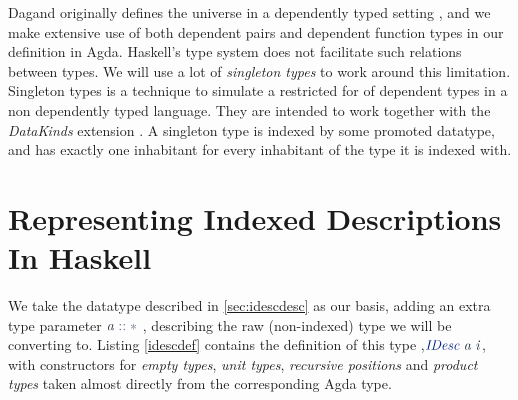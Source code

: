 \documentclass[a4paper,msc,twosized=semi]{uustthesis}
\let\oldemph\emph
\renewcommand\emph[1]{{\large\oldemph{#1}}}
\newcommand*{\mathcolor}{}
\def\mathcolor#1#{\mathcoloraux{#1}}
\newcommand*{\mathcoloraux}[3]{%
  \protect\leavevmode
  \begingroup
    \color#1{#2}#3%
  \endgroup
}
\newcommand{\HSSym}[1]{\mathcolor{hsblue4}{#1}}
\newcommand{\HSCon}[1]{\mathcolor{hsblue3}{\mathit{#1}}}
\newcommand{\HSVar}[1]{\mathcolor{hsblue5}{\mathit{#1}}}
\begin{document}
Dagand originally defines the universe in a dependently typed setting \cite
{dagand2013cosmology}, and we make extensive use of both dependent pairs and dependent 
function types in our definition in Agda. Haskell's type system does not facilitate 
such relations between types. We will use a lot of \emph{singleton types} \cite
{eisenberg2013dependently} to work around this limitation. Singleton types is a 
technique to simulate a restricted for of dependent types in a non dependently typed 
language. They are intended to work together with the \emph{DataKinds} extension \cite
{ghcdocsdatakinds}. A singleton type is indexed by some promoted datatype, and has 
exactly one inhabitant for every inhabitant of the type it is indexed with.   

\section{Representing Indexed Descriptions In Haskell}

  We take the datatype described in \cref{sec:idescdesc} as our basis, adding an extra 
  type parameter \ensuremath{\HSVar{a}\HSSym{::}\HSSym{*}} , describing the raw (non-indexed) type we will be 
  converting to. Listing \ref{idescdef} contains the definition of this type ,\ensuremath{\HSCon{IDesc}\;\HSVar{a}\;\HSVar{i}}, with constructors for \emph{empty types}, \emph{unit types}, \emph{recursive 
  positions} and \emph{product types} taken almost directly from the corresponding 
  Agda type. 
\end{document}
